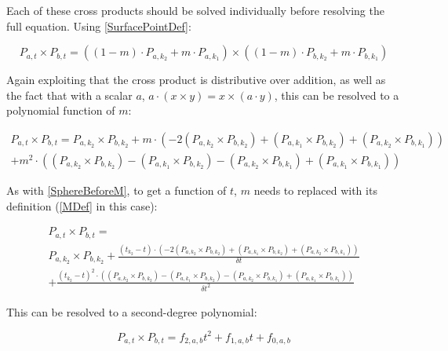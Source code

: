 Each of these cross products should be solved individually before resolving the full equation.
Using \eqref{SurfacePointDef}:

\begin{equation}
    P_{a, t} \times P_{b, t}
    = ((1-m) \cdot P_{a, k_2} + m \cdot P_{a, k_1}) \times ((1-m) \cdot P_{b, k_2} + m \cdot P_{b, k_1})
\end{equation}

Again exploiting that the cross product is distributive over addition, as well as the fact that with a scalar \(a\),
\(a \cdot (x \times y) = x \times (a \cdot y)\), this can be resolved to a polynomial function of \(m\):

\begin{equation}
    \begin{split}
        P_{a, t} \times P_{b, t} =
        P_{a, k_2} \times P_{b, k_2}
        + m \cdot (
        - 2 (P_{a, k_2} \times P_{b, k_2})
        + (P_{a, k_1} \times P_{b, k_2})
        + (P_{a, k_2} \times P_{b, k_1})
        )
        \\
        + m^2 \cdot (
        (P_{a, k_2} \times P_{b, k_2})
        - (P_{a, k_1} \times P_{b, k_2})
        - (P_{a, k_2} \times P_{b, k_1})
        + (P_{a, k_1} \times P_{b, k_1})
        )
    \end{split}
\end{equation}

As with \eqref{SphereBeforeM}, to get a function of \(t\),
\(m\) needs to replaced with its definition (\eqref{MDef} in this case):

\begin{multline*}
    P_{a, t} \times P_{b, t} =
    \\
    P_{a, k_2} \times P_{b, k_2}
    + \frac{(t_{k_2} - t) \cdot (
        - 2 (P_{a, k_2} \times P_{b, k_2})
        + (P_{a, k_1} \times P_{b, k_2})
        + (P_{a, k_2} \times P_{b, k_1})
        )}{\delta t}
    \\
    + \frac{(t_{k_2} - t)^2 \cdot (
        (P_{a, k_2} \times P_{b, k_2})
        - (P_{a, k_1} \times P_{b, k_2})
        - (P_{a, k_2} \times P_{b, k_1})
        + (P_{a, k_1} \times P_{b, k_1})
        )}{\delta t^2}
\end{multline*}

This can be resolved to a second-degree polynomial:

\begin{equation}\label{SurfaceCrossPoly}
    P_{a, t} \times P_{b, t} = f_{2, a, b}t^2 + f_{1, a, b}t + f_{0, a, b}
\end{equation}

